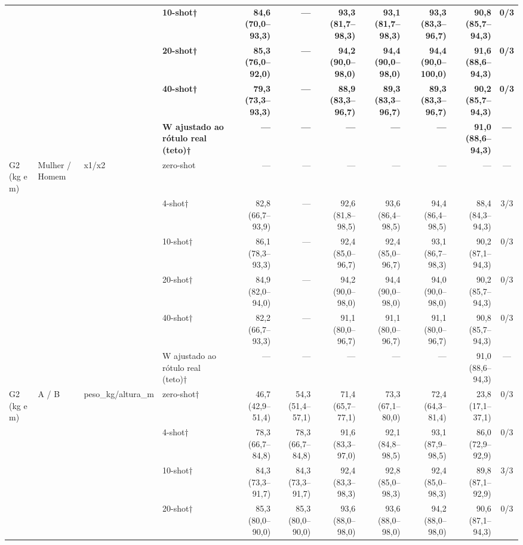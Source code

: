 \begin{table}[htbp]
\begin{tabular}{llllrrrrrrc}
 &  &  & \textbf{10-shot†} & \textbf{84,6 (70,0–93,3)} & \textbf{—} & \textbf{93,3 (81,7–98,3)} & \textbf{93,1 (81,7–98,3)} & \textbf{93,3 (83,3–96,7)} & \textbf{90,8 (85,7–94,3)} & \textbf{0/3} \\
 &  &  & \textbf{20-shot†} & \textbf{85,3 (76,0–92,0)} & \textbf{—} & \textbf{94,2 (90,0–98,0)} & \textbf{94,4 (90,0–98,0)} & \textbf{94,4 (90,0–100,0)} & \textbf{91,6 (88,6–94,3)} & \textbf{0/3} \\
 &  &  & \textbf{40-shot†} & \textbf{79,3 (73,3–93,3)} & \textbf{—} & \textbf{88,9 (83,3–96,7)} & \textbf{89,3 (83,3–96,7)} & \textbf{89,3 (83,3–96,7)} & \textbf{90,2 (85,7–94,3)} & \textbf{0/3} \\
 &  &  & \textbf{W ajustado ao rótulo real (teto)†} & \textbf{—} & \textbf{—} & \textbf{—} & \textbf{—} & \textbf{—} & \textbf{91,0 (88,6–94,3)} & \textbf{—} \\
\midrule
G2 (kg e m) & Mulher / Homem & x1/x2 & zero-shot & — & — & — & — & — & — & — \\
 &  &  & 4-shot† & 82,8 (66,7–93,9) & — & 92,6 (81,8–98,5) & 93,6 (86,4–98,5) & 94,4 (86,4–98,5) & 88,4 (84,3–94,3) & 3/3 \\
 &  &  & 10-shot† & 86,1 (78,3–93,3) & — & 92,4 (85,0–96,7) & 92,4 (85,0–96,7) & 93,1 (86,7–98,3) & 90,2 (87,1–94,3) & 0/3 \\
 &  &  & 20-shot† & 84,9 (82,0–94,0) & — & 94,2 (90,0–98,0) & 94,4 (90,0–98,0) & 94,0 (90,0–98,0) & 90,2 (85,7–94,3) & 0/3 \\
 &  &  & 40-shot† & 82,2 (66,7–93,3) & — & 91,1 (80,0–96,7) & 91,1 (80,0–96,7) & 91,1 (80,0–96,7) & 90,8 (85,7–94,3) & 0/3 \\
 &  &  & W ajustado ao rótulo real (teto)† & — & — & — & — & — & 91,0 (88,6–94,3) & — \\
\midrule
G2 (kg e m) & A / B & peso\_kg/altura\_m & zero-shot† & 46,7 (42,9–51,4) & 54,3 (51,4–57,1) & 71,4 (65,7–77,1) & 73,3 (67,1–80,0) & 72,4 (64,3–81,4) & 23,8 (17,1–37,1) & 0/3 \\
 &  &  & 4-shot† & 78,3 (66,7–84,8) & 78,3 (66,7–84,8) & 91,6 (83,3–97,0) & 92,1 (84,8–98,5) & 93,1 (87,9–98,5) & 86,0 (72,9–92,9) & 0/3 \\
 &  &  & 10-shot† & 84,3 (73,3–91,7) & 84,3 (73,3–91,7) & 92,4 (83,3–98,3) & 92,8 (85,0–98,3) & 92,4 (85,0–98,3) & 89,8 (87,1–92,9) & 3/3 \\
 &  &  & 20-shot† & 85,3 (80,0–90,0) & 85,3 (80,0–90,0) & 93,6 (88,0–98,0) & 93,6 (88,0–98,0) & 94,2 (88,0–98,0) & 90,6 (87,1–94,3) & 0/3 \\

\end{tabular}
\end{table}
